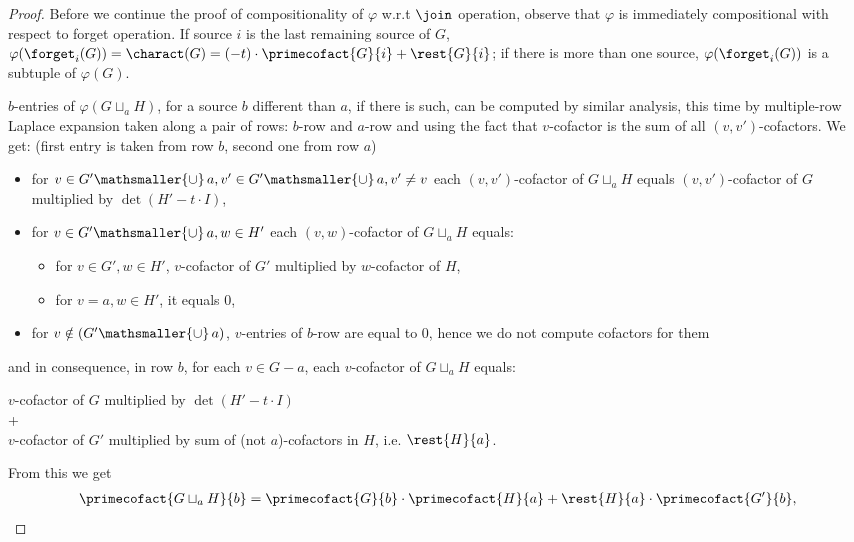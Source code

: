 \begin{proof}
Before we continue the proof of compositionality of $\varphi$ w.r.t $\join$ operation, observe that $\varphi$ is immediately compositional with respect to forget operation. If source $i$ is the last remaining source of $G$, $\varphi(\forget_i(G)) = \charact(G) = (-t)\cdot\primecofact{G}{i} + \rest{G}{i}$; if there is more than one source, $\varphi(\forget_i(G))$ is a subtuple of $\varphi(G)$.

$b$-entries of $\varphi(G \sqcup_aH)$, for a source $b$ different than $a$, if there is such, can be computed by similar analysis, this time by multiple-row Laplace expansion taken along a pair of rows: $b$-row and $a$-row and using the fact that $v$-cofactor is the sum of all $(v, v')$-cofactors. %
We get: (first entry is taken from row $b$, second one from row $a$)
\begin{itemize}
	\item for $v \in G' \mathsmaller{\cup} \ \! a, v' \in G' \mathsmaller{\cup} \ \! a, v' \neq v$ each $(v, v')$-cofactor of $G\sqcup_a H$ equals $(v, v')$-cofactor of $G$ multiplied by $\det(H' - t\cdot I)$,
	\item for $v \in G' \mathsmaller{\cup} \ \! a, w \in H'$ each $(v,w)$-cofactor of $G\sqcup_a H$ equals:
	\begin{itemize}
		\item for $v \in G', w \in H'$, $v$-cofactor of $G'$ multiplied by $w$-cofactor of $H$,
		\item for $v = a, w \in H'$, it equals 0,
	\end{itemize}
	\item for $v \notin (G' \mathsmaller{\cup} \ \! a)$, $v$-entries of $b$-row are equal to 0, hence we do not compute cofactors for them
\end{itemize}
and in consequence,
in row $b$, for each $v\in G-a$, each $v$-cofactor of $G\sqcup_a H$ equals:
\begin{center}
	$v$-cofactor of $G$ multiplied by $\det(H' - t\cdot I)$\\
	+\\
	$v$-cofactor of $G'$ multiplied by sum of (not $a$)-cofactors in $H$, i.e. $\rest{H}{a}$.
\end{center}
From this we get
\begin{align*}
&\primecofact{G\sqcup_a H}{b} = \primecofact{G}{b} \cdot \primecofact{H}{a} + \rest{H}{a} \cdot \primecofact{G'}{b},\\

\end{align*}
\end{proof}
